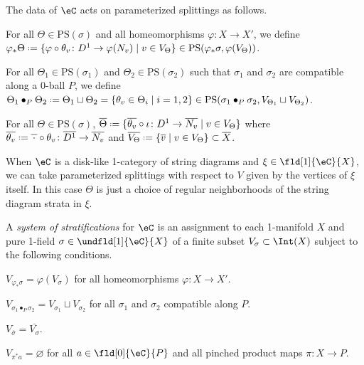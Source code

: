 \documentclass[12pt,reqno]{amsart}
\newcommand{\C}{\eC}
\newcommand{\blt}{\bullet}
\newcommand{\fcj}[1]{\overline{#1}}
\newcommand{\orev}{\overline}
\newcommand{\defn}[1]{\emph{#1}}
\renewcommand{\amalg}{\sqcup}
\DeclareRobustCommand{\coloneq}{\mathrel{\vcenter{\baselineskip0.5ex\lineskiplimit0pt\hbox{\scriptsize{\upshape.}}\hbox{\scriptsize{\upshape.}}}}=}
\begin{document}
The data of $\C$ acts on parameterized splittings as follows.
\begin{lst}  \item[($\Theta\varphi$)]\label{axiom:Theta-phi1} For all $\Theta \in \mathrm{PS}(\sigma)$ and all homeomorphisms $\varphi\colon X\to X'$, we define $\varphi_*\Theta\coloneq\{\varphi\circ\theta_v\colon D^1\to\varphi(N_v)\mid v\in V_\Theta\}\in\mathrm{PS}(\varphi_*\sigma,\varphi(V_\Theta))$.
  \item[($\Theta$G)]\label{1axiom:Theta-G} For all $\Theta_1\in\mathrm{PS}(\sigma_1)$ and $\Theta_2\in\mathrm{PS}(\sigma_2)$ such that $\sigma_1$ and $\sigma_2$ are compatible along a 0-ball $P$, we define $\Theta_1\blt_P\Theta_2\coloneq\Theta_1\amalg\Theta_2=\{\theta_v\in\Theta_i\mid i=1,2\}\in\mathrm{PS}(\sigma_1\blt_P\sigma_2,V_{\Theta_1}\amalg V_{\Theta_2})$.
  \item[($\Theta\orev{\,\cdot\,}$)]\label{axiom:Theta-refl1} For all $\Theta\in\mathrm{PS}(\sigma)$, $\orev\Theta\coloneq\{\orev{\theta_v}\circ\iota\colon D^1\to\orev{N_v}\mid v\in V_\Theta\}$ where $\orev{\theta_v}\coloneq\orev{\,\cdot\,}\circ\theta_v\colon\orev{D^1}\to\orev{N_v}$ and $\orev{V_\Theta}\coloneq\{\orev{v}\mid v\in V_\Theta\}\subset \orev{X}$.
\end{lst}


\begin{remark}
\label{1.33}
When $\C$ is a disk-like 1-category of string diagrams and $\xi\in\fld[1]{\C}{X}$, we can take parameterized splittings with respect to $V$ given by the vertices of $\xi$ itself. In this case $\Theta$ is just a choice of regular neighborhoods of the string diagram strata in $\xi$.
\end{remark}

\begin{definition}
A \defn{system of stratifications} for $\C$ is an assignment to each 1-manifold $X$ and pure 1-field $\sigma\in\undfld[1]{\C}{X}$ of a finite subset $V_\sigma\subset\Int(X)$ subject to the following conditions.
\begin{lst}
  \item[($V\varphi$)]
  \label{axiom:Gamma-nat1} $V_{\varphi_*\sigma}=\varphi(V_\sigma)$ for all homeomorphisms $\varphi\colon X\to X'$.
  \item[($V$G)]
  $V_{\sigma_1\blt_P\sigma_2}=V_{\sigma_1}\amalg V_{\sigma_2}$ for all $\sigma_1$ and $\sigma_2$ compatible along $P$.
  \item[($V\orev{\,\cdot\,}$)]\label{axiom:Gamma-refl1}
  \label{axiom:Gamma-refl} 
  $V_{\fcj\sigma}=\orev{V_\sigma}$.
  \item[($V\pi$)]\label{axiom:Gamma-products1} $V_{\pi^*a}=\varnothing$ for all $a\in\fld[0]{\C}{P}$ and all pinched product maps $\pi\colon X\to P$.
\end{lst}
\end{definition}
\end{document}
